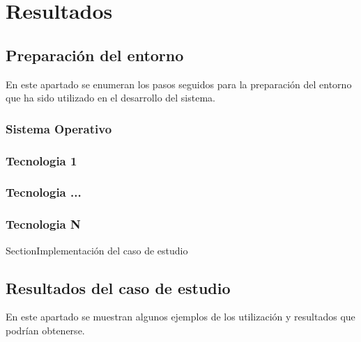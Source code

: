 \chapter{Resultados}
\label{chapter:resultados}


\section{Preparación del entorno}
En este apartado se enumeran los pasos seguidos para la preparación del entorno que ha sido utilizado en el desarrollo del sistema.

\subsection{Sistema Operativo}


\subsection{Tecnologia 1}
\subsection{Tecnologia ...}
\subsection{Tecnologia N}

Section{Implementación del caso de estudio} \label{Implementación del caso de estudio}


\section{Resultados del caso de estudio}

En este apartado se muestran algunos ejemplos de los utilización y resultados que podrían obtenerse.

